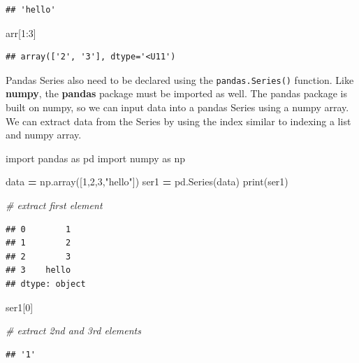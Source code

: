 \documentclass[
]{book}
\newenvironment{Shaded}{\begin{snugshade}}{\end{snugshade}}
\newcommand{\BuiltInTok}[1]{#1}
\newcommand{\CommentTok}[1]{\textcolor[rgb]{0.56,0.35,0.01}{\textit{#1}}}
\newcommand{\DecValTok}[1]{\textcolor[rgb]{0.00,0.00,0.81}{#1}}
\newcommand{\ImportTok}[1]{#1}
\newcommand{\NormalTok}[1]{#1}
\newcommand{\OperatorTok}[1]{\textcolor[rgb]{0.81,0.36,0.00}{\textbf{#1}}}
\newcommand{\StringTok}[1]{\textcolor[rgb]{0.31,0.60,0.02}{#1}}
\begin{document}
\begin{verbatim}
## 'hello'
\end{verbatim}

\begin{Shaded}
\begin{Highlighting}[]
\NormalTok{arr[}\DecValTok{1}\NormalTok{:}\DecValTok{3}\NormalTok{]}
\end{Highlighting}
\end{Shaded}

\begin{verbatim}
## array(['2', '3'], dtype='<U11')
\end{verbatim}

Pandas Series also need to be declared using the \texttt{pandas.Series()} function. Like \textbf{numpy}, the \textbf{pandas} package must be imported as well. The pandas package is built on numpy, so we can input data into a pandas Series using a numpy array. We can extract data from the Series by using the index similar to indexing a list and numpy array.

\begin{Shaded}
\begin{Highlighting}[]
\ImportTok{import}\NormalTok{ pandas }\ImportTok{as}\NormalTok{ pd }
\ImportTok{import}\NormalTok{ numpy }\ImportTok{as}\NormalTok{ np}

\NormalTok{data }\OperatorTok{=}\NormalTok{ np.array([}\DecValTok{1}\NormalTok{,}\DecValTok{2}\NormalTok{,}\DecValTok{3}\NormalTok{,}\StringTok{"hello"}\NormalTok{])}
\NormalTok{ser1 }\OperatorTok{=}\NormalTok{ pd.Series(data)}
\BuiltInTok{print}\NormalTok{(ser1)}

\CommentTok{\# extract first element }
\end{Highlighting}
\end{Shaded}

\begin{verbatim}
## 0        1
## 1        2
## 2        3
## 3    hello
## dtype: object
\end{verbatim}

\begin{Shaded}
\begin{Highlighting}[]
\NormalTok{ser1[}\DecValTok{0}\NormalTok{]}

\CommentTok{\# extract 2nd and 3rd elements }
\end{Highlighting}
\end{Shaded}

\begin{verbatim}
## '1'
\end{verbatim}
\end{document}
